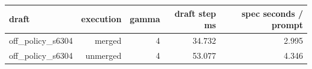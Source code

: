 \begin{tabular}{lrrrr}
\toprule
draft & execution & gamma & draft step ms & spec seconds / prompt \\
\midrule
off\_policy\_s6304 & merged & 4 & 34.732 & 2.995 \\
off\_policy\_s6304 & unmerged & 4 & 53.077 & 4.346 \\
\bottomrule
\end{tabular}
